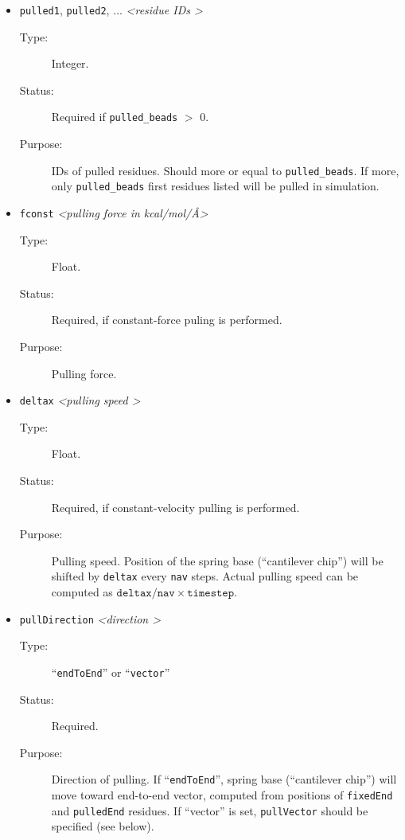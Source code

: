 \documentclass[a4paper]{article}
\begin{document}
\begin{itemize}
\item \texttt{pulled1}, \texttt{pulled2}, $\ldots$ \textit{\textless residue IDs \textgreater}
\begin{description}
\item[Type:] Integer.
\item[Status:] Required if \texttt{pulled\_beads} $>$ $0$.
\item[Purpose:] IDs of pulled residues. Should more or equal to \texttt{pulled\_beads}. If more, only \texttt{pulled\_beads} first residues listed will be pulled in simulation.
\end{description}

\item \texttt{fconst} \textit{\textless pulling force in kcal/mol/\AA \textgreater}
\begin{description}
\item[Type:] Float.
\item[Status:] Required, if constant-force puling is performed.
\item[Purpose:] Pulling force.
\end{description}

\item \texttt{deltax} \textit{\textless pulling speed \textgreater}
\begin{description}
\item[Type:] Float.
\item[Status:] Required, if constant-velocity pulling is performed.
\item[Purpose:] Pulling speed. Position of the spring base (``cantilever chip'') will be shifted by \texttt{deltax} every \texttt{nav} steps. Actual pulling speed can be computed as $\texttt{deltax}/\texttt{nav}\times \texttt{timestep}$.
\end{description}

\item \texttt{pullDirection} \textit{\textless direction \textgreater}
\begin{description}
\item[Type:] ``\texttt{endToEnd}'' or ``\texttt{vector}''
\item[Status:] Required.
\item[Purpose:] Direction of pulling. If ``\texttt{endToEnd}'', spring base (``cantilever chip'') will move toward end-to-end vector, computed from positions of \texttt{fixedEnd} and \texttt{pulledEnd} residues. If ``vector'' is set, \texttt{pullVector} should be specified (see below).
\end{description}


\end{itemize}
\end{document}
